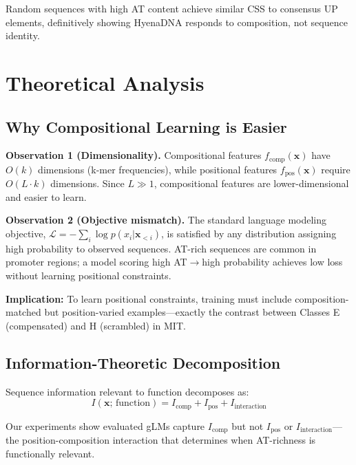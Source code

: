 \documentclass{article}
\begin{document}
Random sequences with high AT content achieve similar CSS to consensus UP elements,
definitively showing HyenaDNA responds to composition, not sequence identity.

\section{Theoretical Analysis}
\label{app:theory}

\subsection{Why Compositional Learning is Easier}

\textbf{Observation 1 (Dimensionality).} Compositional features $f_{\text{comp}}(\mathbf{x})$
have $O(k)$ dimensions (k-mer frequencies), while positional features
$f_{\text{pos}}(\mathbf{x})$ require $O(L \cdot k)$ dimensions.
Since $L \gg 1$, compositional features are lower-dimensional and easier to learn.

\textbf{Observation 2 (Objective mismatch).} The standard language modeling objective,
$\mathcal{L} = -\sum_{i} \log p(x_i | \mathbf{x}_{<i})$,
is satisfied by any distribution assigning high probability to observed sequences.
AT-rich sequences are common in promoter regions; a model scoring high AT$\rightarrow$high
probability achieves low loss without learning positional constraints.

\textbf{Implication:} To learn positional constraints, training must include
composition-matched but position-varied examples---exactly the contrast between
Classes E (compensated) and H (scrambled) in MIT.

\subsection{Information-Theoretic Decomposition}

Sequence information relevant to function decomposes as:
\begin{equation}
I(\mathbf{x};\, \text{function}) = I_{\text{comp}} + I_{\text{pos}} + I_{\text{interaction}}
\end{equation}

Our experiments show evaluated gLMs capture $I_{\text{comp}}$ but not $I_{\text{pos}}$ or
$I_{\text{interaction}}$---the position-composition interaction that determines when AT-richness
is functionally relevant.
\end{document}
